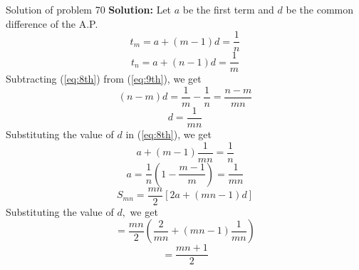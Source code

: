 \documentclass[aspectratio=1610,8pt]{beamer}
\begin{document}
\begin{frame}{Solution of problem 70}
  \textbf{Solution:} Let $a$ be the first term and $d$ be the common difference
  of the A.P.\\
  \setcounter{equation}{0}
  \begin{equation}\label{eq:8th}
    t_m = a + (m - 1)d = \frac{1}{n}
  \end{equation}
  \begin{equation}\label{eq:9th}
    t_n = a + (n - 1)d = \frac{1}{m}
  \end{equation}
  Subtracting (\ref{eq:8th}) from (\ref{eq:9th}), we get
  $$(n - m)d = \frac{1}{m} - \frac{1}{n} = \frac{n - m}{mn}$$
  $$d = \frac{1}{mn}$$
  Substituting the value of $d$ in (\ref{eq:8th}), we get
  $$a + (m - 1)\frac{1}{mn} = \frac{1}{n}$$
  $$a = \frac{1}{n}(1 - \frac{m - 1}{m}) = \frac{1}{mn}$$
  $$S_{mn} = \frac{mn}{2}[2a + (mn - 1)d]$$
  Substituting the value of $d,$ we get
  $$= \frac{mn}{2}\left(\frac{2}{mn} + (mn - 1)\frac{1}{mn}\right)$$
  $$= \frac{mn + 1}{2}$$
\end{frame}
\end{document}

